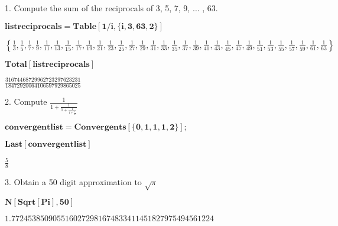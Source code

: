\documentclass{article}
\begin{document}
1. Compute the sum of the reciprocals of 3, 5, 7, 9, $\ldots $ , 63.\\


\begin{doublespace}
\noindent\(\pmb{\text{listreciprocals}=\text{Table}[1/i,\{i,3,63,2\}]}\)
\end{doublespace}

\begin{doublespace}
\noindent\(\left\{\frac{1}{3},\frac{1}{5},\frac{1}{7},\frac{1}{9},\frac{1}{11},\frac{1}{13},\frac{1}{15},\frac{1}{17},\frac{1}{19},\frac{1}{21},\frac{1}{23},\frac{1}{25},\frac{1}{27},\frac{1}{29},\frac{1}{31},\frac{1}{33},\frac{1}{35},\frac{1}{37},\frac{1}{39},\frac{1}{41},\frac{1}{43},\frac{1}{45},\frac{1}{47},\frac{1}{49},\frac{1}{51},\frac{1}{53},\frac{1}{55},\frac{1}{57},\frac{1}{59},\frac{1}{61},\frac{1}{63}\right\}\)
\end{doublespace}

\begin{doublespace}
\noindent\(\pmb{\text{Total}[\text{listreciprocals}]}\)
\end{doublespace}

\begin{doublespace}
\noindent\(\frac{31674468729962723297623231}{18472920064106597929865025}\)
\end{doublespace}

2. Compute \(\frac{1}{1+\frac{1}{1+\frac{1}{1+\frac{1}{2}}}}\)\\


\begin{doublespace}
\noindent\(\pmb{\text{convergentlist}=\text{Convergents}[\{0,1,1,1,2\}];}\)
\end{doublespace}

\begin{doublespace}
\noindent\(\pmb{\text{Last}[\text{convergentlist}]}\)
\end{doublespace}

\begin{doublespace}
\noindent\(\frac{5}{8}\)
\end{doublespace}

3. Obtain a 50 digit approximation to \(\sqrt{\pi }\)\\


\begin{doublespace}
\noindent\(\pmb{N[\text{Sqrt}[\text{Pi}],50]}\)
\end{doublespace}

\begin{doublespace}
\noindent\(1.7724538509055160272981674833411451827975494561224\)
\end{doublespace}
\end{document}
